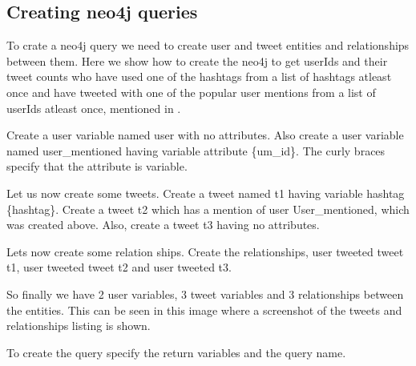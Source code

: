 \documentclass[letterpaper,10pt,english]{sphinxmanual}
\begin{document}
\subsection{Creating neo4j queries}
\label{\detokenize{dashboard_website:creating-neo4j-queries}}
To crate a neo4j query we need to create user and tweet entities and relationships between them. Here we show how to create the neo4j to get userIds and their tweet counts who have used one of the hashtags from a list of hashtags atleast once and have tweeted with one of the popular user mentions from a list of userIds atleast once, mentioned in {\hyperref[\detokenize{dag:building-a-dag-from-queries}]{}}.

Create a user variable named user with no attributes. Also create a user variable named user\_mentioned having variable attribute \{um\_id\}. The curly braces specify that the attribute is variable.
\begin{quote}

\noindent{}
\end{quote}

Let us now create some tweets. Create a tweet named t1 having variable hashtag \{hashtag\}. Create a tweet t2 which has a mention of user User\_mentioned, which was created above. Also, create a tweet t3 having no attributes.
\begin{quote}

\noindent{}
\end{quote}

Lets now create some relation ships. Create the relationships, user tweeted tweet t1, user tweeted tweet t2 and user tweeted t3.
\begin{quote}

\noindent{}
\end{quote}

So finally we have 2 user variables, 3 tweet variables and 3 relationships between the entities. This can be seen in this image where a screenshot of the tweets and relationships listing is shown.
\begin{quote}

\noindent{}
\end{quote}

To create the query specify the return variables and the query name.
\begin{quote}

\noindent{}
\end{quote}
\end{document}
